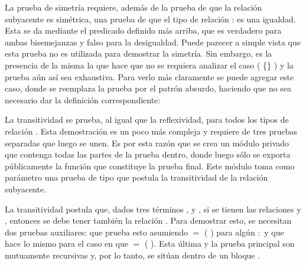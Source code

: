 
La prueba de simetría requiere, además de la prueba de que la relación subyacente \AgdaFunction{$\_\sim\_$} es simétrica, una prueba de que el tipo de relación  :  es una igualdad. Esta se da mediante el predicado  definido más arriba, que es verdadero para ambas bisemejanzas y falso para la desigualdad. Puede parecer a simple vista que esta prueba no es utilizada para demostrar la simetría. Sin embargo, es la presencia de la misma la que hace que no se requiera analizar el caso ( \{\} ) y la prueba aún así sea exhaustiva. Para verlo más claramente se puede agregar este caso, donde se reemplaza la prueba  por el patrón absurdo, haciendo que no sea necesario dar la definición correspondiente:
 

La transitividad se prueba, al igual que la reflexividad, para todos los tipos de relación . Esta demostración es un poco más compleja y requiere de tres pruebas separadas que luego se unen. Es por esta razón que se crea un módulo privado  que contenga todas las partes de la prueba dentro, donde luego sólo se exporta públicamente la función  que constituye la prueba final. Este módulo toma como parámetro una prueba  de tipo  \AgdaBound{$\_\sim\_$} que postula la transitividad de la relación subyacente. 


La transitividad postula que, dados tres términos ,  y , si se tienen las relaciones   y  , entonces se debe tener también la relación  . Para demostrar esto, se necesitan dos pruebas auxiliares:  que prueba esto asumiendo  $=$ ( ) para algún  $:$  y  que hace lo mismo para el caso en que  $=$ ( ). Esta última y la prueba principal  son mutuamente recursivas y, por lo tanto, se sitúan dentro de un bloque .


